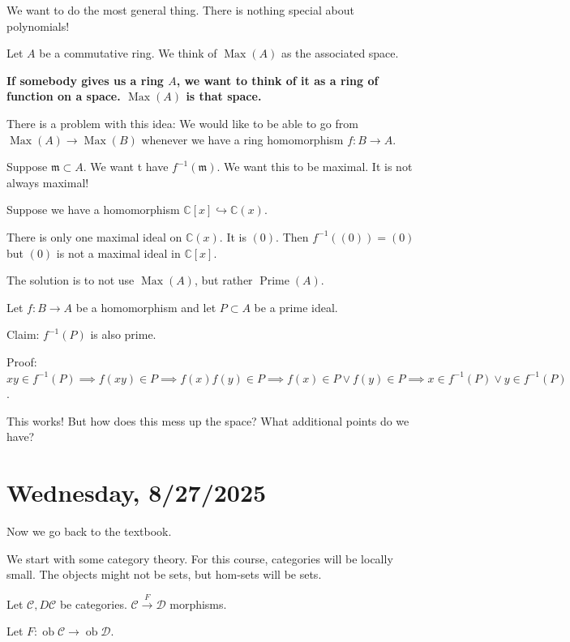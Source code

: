 \documentclass{article}
\theoremstyle{definition}
\begin{document}
    We want to do the most general thing. There is nothing special about polynomials!

    Let \(A\) be a commutative ring.  We think of \(\operatorname{Max}(A)\) as the associated space.

    \textbf{If somebody gives us a ring \(A\), we want to think of it as a ring of function on a space. \(\operatorname{Max}(A)\) is that space.}

    There is a problem with this idea: We would like to be able to go from \(\operatorname{Max}(A) \to \operatorname{Max}(B)\) whenever we have a ring homomorphism \(f: B \to A\).

    Suppose \(\mathfrak{m} \subset A\). We want t have \(f ^{-1} (\mathfrak{m})\). We want this to be maximal. It is not always maximal!
    
    Suppose we have a homomorphism \(\mathbb{C} [x] \hookrightarrow \mathbb{C} (x)\).

    There is only one maximal ideal on \(\mathbb{C}(x)\). It is \((0)\). Then \(f ^{-1} ((0)) = (0)\) but \((0)\) is not a maximal ideal in \(\mathbb{C}[x]\).

    The solution is to not use \(\operatorname{Max}(A)\), but rather \(\operatorname{Prime}(A)\).

    Let \(f: B \to A\) be a homomorphism and let \(P \subset A\) be a prime ideal.

    Claim: \(f^{-1} (P)\) is also prime.

    Proof: \(xy\in f ^{-1} (P) \implies f(xy)\in P \implies f(x)f(y)\in P \implies f(x) \in P \lor f(y)\in P \implies x\in f ^{-1} (P) \lor y\in f ^{-1} (P)\).

    This works! But how does this mess up the space? What additional points do we have?

    \section*{Wednesday, 8/27/2025}
    
    Now we go back to the textbook.

    We start with some category theory. For this course, categories will be locally small. The objects might not be sets, but hom-sets will be sets.

    Let \(\mathcal{C}, D\mathcal{C}\) be categories. \(\mathcal{C} \xrightarrow{F} \mathcal{D}\) morphisms.

    Let \(F: \operatorname{ob} \mathcal{C} \to \operatorname{ob} \mathcal{D}\).
\end{document}

